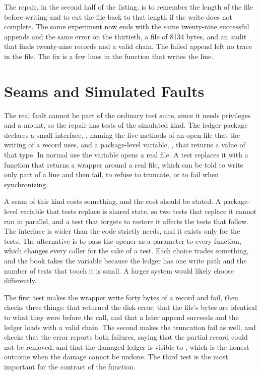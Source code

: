 The repair, in the second half of the listing, is to remember the length of the file before writing and to cut the file back to that length if the write does not complete. The same experiment now ends with the same twenty-nine successful appends and the same error on the thirtieth, a file of 8134 bytes, and an audit that finds twenty-nine records and a valid chain. The failed append left no trace in the file. The fix is a few lines in the function that writes the line.

\section{Seams and Simulated Faults}

The real fault cannot be part of the ordinary test suite, since it needs privileges and a mount, so the repair has tests of the simulated kind. The ledger package declares a small interface, , naming the five methods of an open file that the writing of a record uses, and a package-level variable, , that returns a value of that type. In normal use the variable opens a real file. A test replaces it with a function that returns a wrapper around a real file, which can be told to write only part of a line and then fail, to refuse to truncate, or to fail when synchronizing.


A seam of this kind costs something, and the cost should be stated. A package-level variable that tests replace is shared state, so two tests that replace it cannot run in parallel, and a test that forgets to restore it affects the tests that follow. The interface is wider than the code strictly needs, and it exists only for the tests. The alternative is to pass the opener as a parameter to every function, which changes every caller for the sake of a test. Each choice trades something, and the book takes the variable because the ledger has one write path and the number of tests that touch it is small. A larger system would likely choose differently.

The first test makes the wrapper write forty bytes of a record and fail, then checks three things: that  returned the disk error, that the file's bytes are identical to what they were before the call, and that a later append succeeds and the ledger loads with a valid chain. The second makes the truncation fail as well, and checks that the error reports both failures, saying that the partial record could not be removed, and that the damaged ledger is visible to , which is the honest outcome when the damage cannot be undone. The third test is the most important for the contract of the function.

